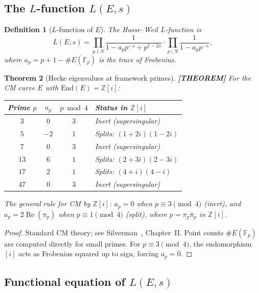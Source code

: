\documentclass[11pt]{article}
\theoremstyle{tight}
\newtheorem{theorem}{Theorem}[section]
\theoremstyle{plainroman}
\newtheorem{definition}[theorem]{Definition}
\newcommand{\Z}{\mathbb{Z}}
\begin{document}
\subsection{The $L$-function $L(E,s)$}

\begin{definition}[$L$-function of $E$]
The Hasse--Weil $L$-function is
\[
L(E,s)=\prod_{p\nmid N}\frac{1}{1-a_p p^{-s}+p^{1-2s}}\cdot\prod_{p\mid N}\frac{1}{1-a_p p^{-s}},
\]
where $a_p=p+1-\#E(\mathbb{F}_p)$ is the trace of Frobenius.
\end{definition}

\begin{theorem}[Hecke eigenvalues at framework primes]\label{thm:hecke}
\textbf{[THEOREM]}
For the CM curve $E$ with $\mathrm{End}(E)=\Z[i]$:
\begin{center}
\renewcommand{\arraystretch}{1.15}
\begin{tabular}{cccl}
\toprule
Prime $p$ & $a_p$ & $p\bmod 4$ & Status in $\Z[i]$ \\
\midrule
$3$ & $0$ & $3$ & Inert (supersingular) \\
$5$ & $-2$ & $1$ & Splits: $(1+2i)(1-2i)$ \\
$7$ & $0$ & $3$ & Inert (supersingular) \\
$13$ & $6$ & $1$ & Splits: $(2+3i)(2-3i)$ \\
$17$ & $2$ & $1$ & Splits: $(4+i)(4-i)$ \\
$47$ & $0$ & $3$ & Inert (supersingular) \\
\bottomrule
\end{tabular}
\end{center}
The general rule for CM by $\Z[i]$: $a_p=0$ when $p\equiv 3\pmod{4}$ (inert), and $a_p=2\operatorname{Re}(\pi_p)$ when $p\equiv 1\pmod{4}$ (split), where $p=\pi_p\bar\pi_p$ in $\Z[i]$.
\end{theorem}
\begin{proof}
Standard CM theory; see Silverman~\cite{silverman}, Chapter~II.
Point counts $\#E(\mathbb{F}_p)$ are computed directly for small primes.
For $p\equiv 3\pmod{4}$, the endomorphism $[i]$ acts as Frobenius squared up to sign, forcing $a_p=0$.
\end{proof}

\subsection{Functional equation of $L(E,s)$}
\end{document}
